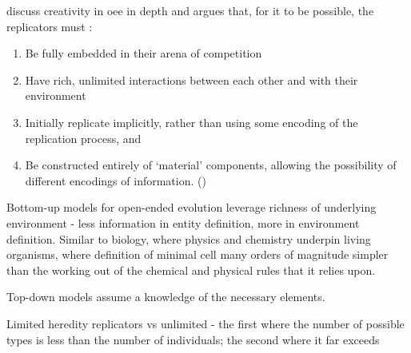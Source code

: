 \Textcite{Taylor2001,Taylor:1999sc} discuss creativity in \gls{oee} in depth and argues that, for it to be possible, the replicators must \parencite{Hutton2004}:\begin{enumerate}[label=\roman*] \item Be fully embedded in their arena of competition \item Have rich, unlimited interactions between each other and with their environment \item Initially replicate implicitly, rather than using some encoding of the replication process, and \item Be constructed entirely of `material' components, allowing the possibility of different encodings of information. ()
\end{enumerate}

Bottom-up models for open-ended evolution leverage richness of underlying environment - less information in entity definition, more in environment definition. Similar to biology, where physics and chemistry underpin living organisms, where definition of minimal cell many orders of magnitude simpler than the working out of the chemical and physical rules that it relies upon.

Top-down models assume a knowledge of the necessary elements.

Limited heredity replicators vs unlimited - the first where the number of possible types is less than the number of individuals; the second where it far exceeds\cite{Szathmary:2006ty}

